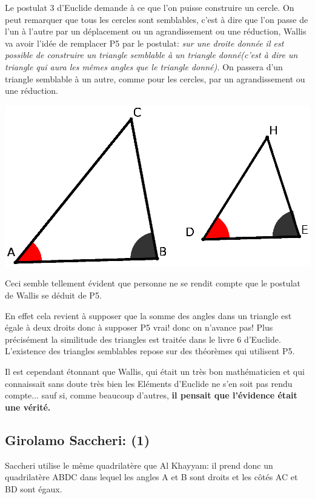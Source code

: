 \documentclass[a4paper, 12pt, twoside]{book}
\begin{document}
   Le postulat 3 d'Euclide demande à ce que l'on puisse construire un cercle. On peut remarquer que tous les cercles sont semblables, c'est à dire que l'on passe de l'un à l'autre par un déplacement ou un agrandissement ou une réduction, Wallis va avoir l'idée de remplacer P5 par le postulat: \textit{sur une droite donnée il est possible de construire un triangle semblable à un triangle donné(c'est à dire un triangle qui aura les mêmes angles que le triangle donné).} On passera d'un triangle semblable à un autre, comme pour les cercles, par un agrandissement ou une réduction.

\includegraphics[scale=0.8]{figures/WAL1.eps} 


   Ceci semble tellement évident que personne ne se rendit compte que le postulat de Wallis se déduit de P5.

En effet cela revient à supposer que la somme des angles dans un triangle est égale à deux droits donc à supposer P5 vrai! donc on n'avance pas! Plus précisément la similitude des triangles est traitée dans le livre 6 d'Euclide. L'existence des triangles semblables repose sur des théorèmes qui utilisent P5. \bigskip 

 Il est cependant étonnant que Wallis, qui était un très bon mathématicien et qui connaissait sans doute très bien les Eléments d'Euclide ne s'en soit pas rendu compte... sauf si, comme beaucoup d'autres,\textbf{ il pensait que l'évidence était une vérité.} 

 \subsection{Girolamo Saccheri: (1)}

Saccheri  utilise le même quadrilatère que   Al Khayyam: il prend donc un quadrilatère ABDC dans lequel les angles A et B sont droits et les côtés AC et BD sont égaux.
\end{document}
